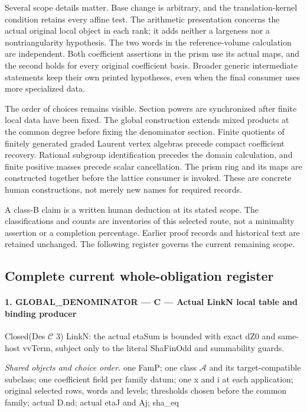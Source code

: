 Several scope details matter. Base change is arbitrary, and the
translation-kernel condition retains every affine test. The arithmetic
presentation concerns the actual original local object in each rank;
it adds neither a largeness nor a nontriangularity hypothesis.
The two words in the reference-volume calculation are independent.
Both coefficient assertions in the prism use its actual maps, and
the second holds for every original coefficient basis. Broader generic
intermediate statements keep their own printed hypotheses, even when
the final consumer uses more specialized data.

The order of choices remains visible. Section powers are synchronized
after finite local data have been fixed. The global construction extends
mixed products at the common degree before fixing the denominator section.
Finite quotients of finitely generated graded Laurent vertex algebras
precede compact coefficient recovery. Rational subgroup identification
precedes the domain calculation, and finite positive masses precede
scalar cancellation. The prism ring and its maps are constructed
together before the lattice consumer is invoked. These are concrete
human constructions, not merely new names for required records.

A class-B claim is a written human deduction at its stated scope.
The classifications and counts are inventories of this selected route,
not a minimality assertion or a completion percentage. Earlier proof
records and historical text are retained unchanged. The following
register governs the current remaining scope.

\subsection{Complete current whole-obligation register}
\paragraph{1. GLOBAL\_\allowbreak DENOMINATOR — C — Actual LinkN local table and binding producer}

Closed(Des $\mathcal C$ 3) LinkN: the actual etaSum is bounded with exact dZ0 and same-host vvTerm, subject only to the literal ShaFinOdd and summability guards.

\emph{Shared objects and choice order.} one FamP; one class $\mathcal A$ and its target-compatible subclass; one coefficient field per family datum; one x and i at each application; original selected rows, words and levels; thresholds chosen before the common family; actual D.nd; actual etaJ and Aj; sha\_\allowbreak eq

